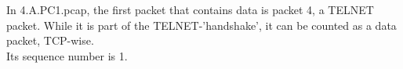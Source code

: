 In 4.A.PC1.pcap, the first packet that contains data is packet 4, a TELNET packet.
While it is part of the TELNET-'handshake', it can be counted as a data packet, TCP-wise.\\ Its sequence number is 1.
